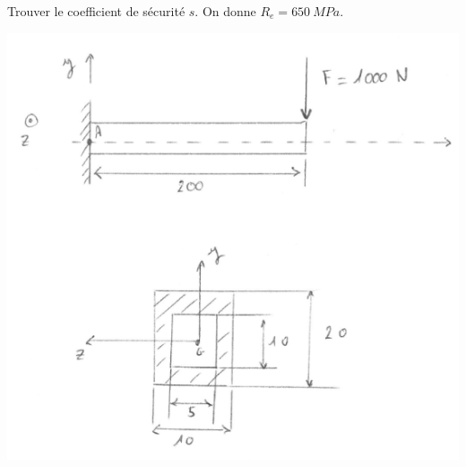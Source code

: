 \documentclass[lecture.tex]{subfiles}
\begin{document}
\exercice{}

Trouver le coefficient de sécurité $s$. On donne $R_e = 650 \ MPa$.

\begin{center}
  \includegraphics[scale=0.5]{figA0039.png}
\end{center}

\finexercice
\end{document}
